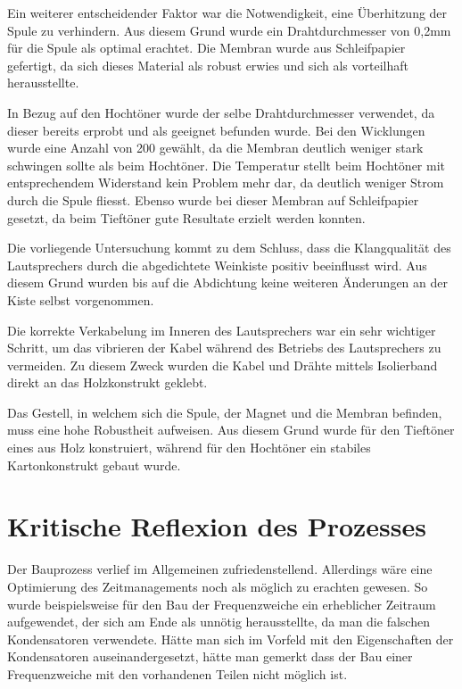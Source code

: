 \documentclass[a4paper,11pt]{report}
\begin{document}
Ein weiterer entscheidender Faktor war die Notwendigkeit, eine Überhitzung der Spule zu verhindern. Aus diesem Grund wurde ein Drahtdurchmesser von 0,2mm für die Spule als optimal erachtet. Die Membran wurde aus Schleifpapier gefertigt, da sich dieses Material als robust erwies und sich als vorteilhaft herausstellte. 

In Bezug auf den Hochtöner wurde der selbe Drahtdurchmesser verwendet, da dieser bereits erprobt und als geeignet befunden wurde. Bei den Wicklungen wurde eine Anzahl von 200 gewählt, da die Membran deutlich weniger stark schwingen sollte als beim Hochtöner. Die Temperatur stellt beim Hochtöner mit entsprechendem Widerstand kein Problem mehr dar, da deutlich weniger Strom durch die Spule fliesst. Ebenso wurde bei dieser Membran auf Schleifpapier gesetzt, da beim Tieftöner gute Resultate erzielt werden konnten.

Die vorliegende Untersuchung kommt zu dem Schluss, dass die Klangqualität des Lautsprechers durch die abgedichtete Weinkiste positiv beeinflusst wird. Aus diesem Grund wurden bis auf die Abdichtung keine weiteren Änderungen an der Kiste selbst vorgenommen.

Die korrekte Verkabelung im Inneren des Lautsprechers war ein sehr wichtiger Schritt, um das vibrieren der Kabel während des Betriebs des Lautsprechers zu vermeiden. Zu diesem Zweck wurden die Kabel und Drähte mittels Isolierband direkt an das Holzkonstrukt geklebt.

Das Gestell, in welchem sich die Spule, der Magnet und die Membran befinden, muss eine hohe Robustheit aufweisen. Aus diesem Grund wurde für den Tieftöner eines aus Holz konstruiert, während für den Hochtöner ein stabiles Kartonkonstrukt gebaut wurde.

\section{Kritische Reflexion des Prozesses}
Der Bauprozess verlief im Allgemeinen zufriedenstellend. Allerdings wäre eine Optimierung des Zeitmanagements noch als möglich zu erachten gewesen. So wurde beispielsweise für den Bau der Frequenzweiche ein erheblicher Zeitraum aufgewendet, der sich am Ende als unnötig herausstellte, da man die falschen Kondensatoren verwendete. Hätte man sich im Vorfeld mit den Eigenschaften der Kondensatoren auseinandergesetzt, hätte man gemerkt dass der Bau einer Frequenzweiche mit den vorhandenen Teilen nicht möglich ist.

\newpage
\end{document}
